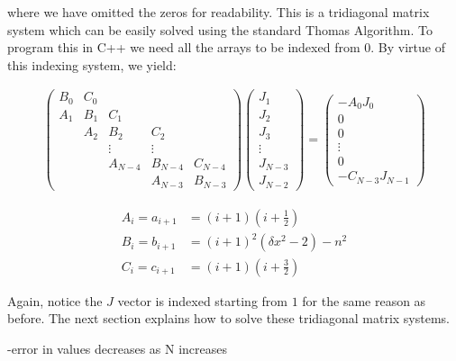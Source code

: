 \documentclass[onecolumn, groupedaddress, 10pt]{revtex4-1}
\begin{document}
where we have omitted the zeros for readability.  This is a tridiagonal matrix system which can be easily solved using the standard Thomas Algorithm.  To program this in C++ we need all the arrays to be indexed from 0.  By virtue of this indexing system, we yield:

\begin{align}
\label{eqn:finalDiscretizedBesselMatrixEqn}
\left( \begin{array}{ccccc}
	B_0 & C_0 &         &         &         \\
	A_1 & B_1 &   C_1   &         &         \\
	    & A_2 &   B_2   &   C_2   &         \\
	    &     & \vdots  & \vdots  &         \\
	    &     & A_{N-4} & B_{N-4} & C_{N-4} \\
	    &     &         & A_{N-3} & B_{N-3}
\end{array} \right)
\left( \begin{array}{c}
	  J_1   \\
	  J_2   \\
	  J_3   \\
	\vdots  \\
	J_{N-3} \\
	J_{N-2}
\end{array} \right)
=
\left( \begin{array}{c}
	    - A_0 J_0     \\
	        0         \\
	        0         \\
	     \vdots       \\
	        0         \\
	- C_{N-3} J_{N-1}
\end{array} \right)
\end{align}

\begin{align}
A_i = a_{i+1} &= (i+1)   \left( i + \frac{1}{2} \right)				\\
B_i = b_{i+1} &= (i+1)^2 \left( \delta x^2 - 2  \right) - n^2			\\
C_i = c_{i+1} &= (i+1)   \left( i + \frac{3}{2} \right)
\end{align}

Again, notice the $J$ vector is indexed starting from $1$ for the same reason as before.  The next section explains how to solve these tridiagonal matrix systems.

-error in values decreases as N increases
\end{document}
